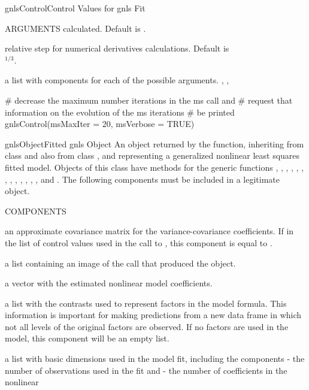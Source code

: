\documentclass[pdftex]{article} \usepackage{url,graphicx}
\begin{document}
\begin{Helpfile}{gnlsControl}{Control Values for gnls Fit}
\begin{Argument}{ARGUMENTS}
calculated. Default is .
\item[\Co{.relStep:}]
relative step for numerical derivatives
calculations. Default is \\
$^{1/3}$.
\end{Argument}
a list with components for each of the possible arguments.
, , 
\need 15pt
\vspace{-16pt}
\begin{Example}
# decrease the maximum number iterations in the ms call and
# request that information on the evolution of the ms iterations 
# be printed
gnlsControl(msMaxIter = 20, msVerbose = TRUE)
\end{Example}
\end{Helpfile}
\begin{Helpfile}{gnlsObject}{Fitted gnls Object}
An object returned by the  function, inheriting from class
 and also from class , and representing a
generalized nonlinear least squares fitted model. Objects of this
class have methods for the generic functions  ,
, , , ,
, , , ,
, , , , and
.
The following components must be included in a legitimate 
object. 
\begin{Argument}{COMPONENTS}
\item[\Co{apVar:}]
an approximate covariance matrix for the
variance-covariance coefficients. If  in the list
of control values used in the call to , this
component is equal to .
\item[\Co{call:}]
a list containing an image of the  call that
produced the object.
\item[\Co{coefficients:}]
a vector with the estimated nonlinear model
coefficients.
\item[\Co{contrasts:}]
a list with the contrasts used to represent factors
in the model formula. This information is important for making
predictions from a new data frame in which not all levels of the
original factors are observed. If no factors are used in the model,
this component will be an empty list.
\item[\Co{dims:}]
a list with basic dimensions used in the model fit,
including the components  - the number of observations used in
the fit and  - the number of coefficients in the nonlinear

\end{Argument}
\end{Helpfile}
\end{document}
